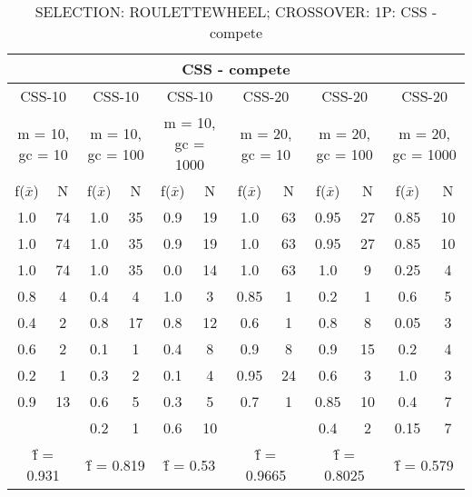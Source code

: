 \begin{table}[H]
	\centering
	\caption{SELECTION: ROULETTEWHEEL; CROSSOVER: 1P: CSS - compete}
	\begin{adjustbox}{width=1\textwidth}
		\begin{tabular}{ |c|c||c|c||c|c||c|c||c|c||c|c| }
			\hline
			\multicolumn{12}{|c|}{CSS - compete} \\
			\hline
			\multicolumn{2}{|c||}{CSS-10} & \multicolumn{2}{c||}{CSS-10} & \multicolumn{2}{c||}{CSS-10} & \multicolumn{2}{c||}{CSS-20} & \multicolumn{2}{c||}{CSS-20} & \multicolumn{2}{c|}{CSS-20}\\
			\hline
			\multicolumn{2}{|c||}{m = 10, gc = 10} & \multicolumn{2}{c||}{m = 10, gc = 100} & \multicolumn{2}{c||}{m = 10, gc = 1000} & \multicolumn{2}{c||}{m = 20, gc = 10} & \multicolumn{2}{c||}{m = 20, gc = 100} & \multicolumn{2}{c|}{m = 20, gc = 1000}\\
			\hline
			f($\bar{x}$) & N & f($\bar{x}$) & N & f($\bar{x}$) & N & f($\bar{x}$) & N & f($\bar{x}$) & N & f($\bar{x}$) & N\\
			\hline
			\hline
			1.0 & 74 & 1.0 & 35 & 0.9 & 19 & 1.0 & 63 & 0.95 & 27 & 0.85 & 10\\
			\hline
			1.0 & 74 & 1.0 & 35 & 0.9 & 19 & 1.0 & 63 & 0.95 & 27 & 0.85 & 10\\
			1.0 & 74 & 1.0 & 35 & 0.0 & 14 & 1.0 & 63 & 1.0 & 9 & 0.25 & 4\\
			0.8 & 4 & 0.4 & 4 & 1.0 & 3 & 0.85 & 1 & 0.2 & 1 & 0.6 & 5\\
			0.4 & 2 & 0.8 & 17 & 0.8 & 12 & 0.6 & 1 & 0.8 & 8 & 0.05 & 3\\
			0.6 & 2 & 0.1 & 1 & 0.4 & 8 & 0.9 & 8 & 0.9 & 15 & 0.2 & 4\\
			0.2 & 1 & 0.3 & 2 & 0.1 & 4 & 0.95 & 24 & 0.6 & 3 & 1.0 & 3\\
			0.9 & 13 & 0.6 & 5 & 0.3 & 5 & 0.7 & 1 & 0.85 & 10 & 0.4 & 7\\
			&   & 0.2 & 1 & 0.6 & 10 &   &   & 0.4 & 2 & 0.15 & 7\\
			\hline
			\multicolumn{2}{|c||}{\^{f} = 0.931} & \multicolumn{2}{c||}{\^{f} = 0.819} & \multicolumn{2}{c||}{\^{f} = 0.53} & \multicolumn{2}{c||}{\^{f} = 0.9665} & \multicolumn{2}{c||}{\^{f} = 0.8025} & \multicolumn{2}{c|}{\^{f} = 0.579}\\
			\hline
		\end{tabular}
	\end{adjustbox}
\end{table}

